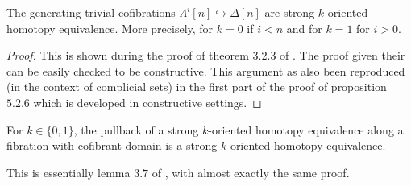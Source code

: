 \documentclass[reqno,10pt,a4paper,oneside,draft]{amsart}
\begin{document}
\begin{lemma}\label{lemma:genTcof_strongHequiv}
The generating trivial cofibrations $\Lambda^i[n] \hookrightarrow \Delta[n]$ are strong $k$-oriented homotopy equivalence.
More precisely, for $k=0$ if $i<n$ and for $k=1$ for $i>0$. 
\end{lemma}

\begin{proof}
This is shown during the proof of theorem $3.2.3$ of \cite{joyal-tierney:simplicial-homotopy-theory}. The proof given their can be easily checked to be constructive. This argument as also been reproduced (in the context of complicial sets) in the first part of the proof of proposition $5.2.6$ \cite{henry2018wms} which is developed in constructive settings.


\end{proof}


\begin{lemma} 
\label{lemma:pb_of_StrongHomotopyEq}
For $k \in \{0,1\}$, the pullback of a strong $k$-oriented homotopy equivalence
 along a fibration with cofibrant domain is a strong $k$-oriented homotopy equivalence.
\end{lemma}

This is essentially lemma $3.7$ of \cite{gambino2017frobenius}, with almost exactly the same proof.
\end{document}
